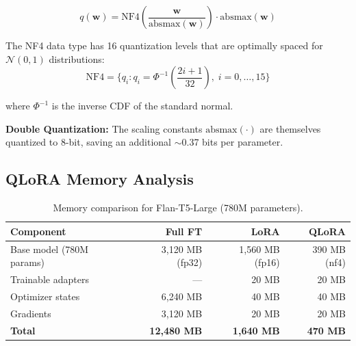 \documentclass[11pt, a4paper]{article}
\begin{document}
\begin{equation}
q(\mathbf{w}) = \text{NF4}\!\left(\frac{\mathbf{w}}{\text{absmax}(\mathbf{w})}\right) \cdot \text{absmax}(\mathbf{w})
\end{equation}

The NF4 data type has 16 quantization levels that are optimally spaced for $\mathcal{N}(0, 1)$ distributions:
\begin{equation}
\text{NF4} = \{q_i : q_i = \Phi^{-1}\!\left(\frac{2i + 1}{32}\right), \; i = 0, \ldots, 15\}
\end{equation}

where $\Phi^{-1}$ is the inverse CDF of the standard normal.

\textbf{Double Quantization:} The scaling constants $\text{absmax}(\cdot)$ are themselves quantized to 8-bit, saving an additional $\sim$0.37 bits per parameter.

\subsection{QLoRA Memory Analysis}

\begin{table}[H]
\centering
\begin{tabular}{lrrr}
\toprule
\textbf{Component} & \textbf{Full FT} & \textbf{LoRA} & \textbf{QLoRA} \\
\midrule
Base model (780M params) & 3,120 MB (fp32) & 1,560 MB (fp16) & 390 MB (nf4) \\
Trainable adapters & --- & 20 MB & 20 MB \\
Optimizer states & 6,240 MB & 40 MB & 40 MB \\
Gradients & 3,120 MB & 20 MB & 20 MB \\
\midrule
\textbf{Total} & \textbf{12,480 MB} & \textbf{1,640 MB} & \textbf{470 MB} \\
\bottomrule
\end{tabular}
\caption{Memory comparison for Flan-T5-Large (780M parameters).}
\label{tab:memory}
\end{table}
\end{document}
